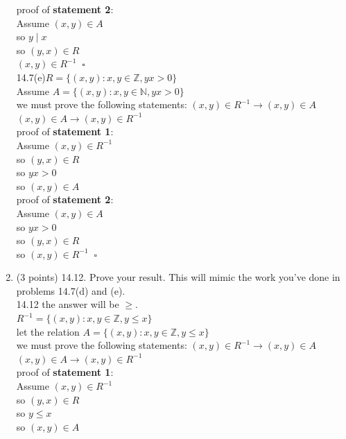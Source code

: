 \documentclass[12pt]{article}
\begin{document}
\begin{enumerate}
proof of \textbf{statement 2}:\\
Assume $(x,y) \in A$\\
so $y \mid x$\\
so $(y,x) \in R$\\
$(x,y) \in R^{-1} \;\; \square$\\


14.7(e)$R=\{(x,y):x,y \in \mathbb{Z},yx>0 \} $\\
Assume $A=\{(x,y):x,y \in \mathbb{N},yx>0 \} $\\
we must prove the following statements:
$(x,y) \in R^{-1} \rightarrow (x,y) \in A $\\
$(x,y) \in A \rightarrow (x,y) \in R^{-1} $\\

proof of \textbf{statement 1}:\\
Assume $(x,y) \in R^{-1}$\\
so $(y,x) \in R$\\
so $yx>0$\\
so $(x,y) \in A$\\

proof of \textbf{statement 2}:\\
Assume $(x,y) \in A$\\
so $yx>0$\\
so $(y,x) \in R$\\
so $(x,y) \in R^{-1} \;\; \square$\\

\item (3 points)  14.12.  Prove your result.  This will mimic the work you've done in problems 14.7(d) and (e).  \\

14.12 the answer will be $\geq$.\\
$R^{-1}=\{(x,y):x,y \in \mathbb{Z},y \leq x \}$\\

let the relation $A=\{(x,y):x,y \in \mathbb{Z},y \leq x \}$\\
we must prove the following statements:
$(x,y) \in R^{-1} \rightarrow (x,y) \in A $\\
$(x,y) \in A \rightarrow (x,y) \in R^{-1} $\\

proof of \textbf{statement 1}:\\
Assume $(x,y) \in R^{-1}$\\
so $(y,x) \in R$\\
so $y \leq x$\\
so $(x,y) \in A$\\


\end{enumerate}
\end{document}
